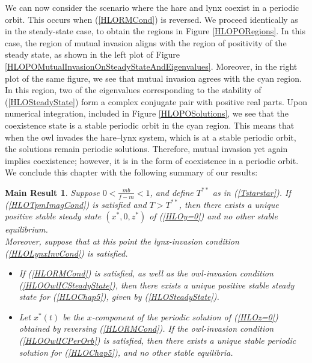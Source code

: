 \documentclass[12pt]{UOthesis}
\theoremstyle{remarkstyle}
\newtheorem{MainResult}[theo]{Main Result}
\begin{document}
We can now consider the scenario where the hare and lynx coexist in a periodic orbit. This occurs when (\ref{HLORMCond}) is reversed. We proceed identically as in the steady-state case, to obtain the regions in Figure \ref{HLOPORegions}. In this case, the region of mutual invasion aligns with the region of positivity of the steady state, as shown in the left plot of Figure \ref{HLOPOMutualInvasionOnSteadyStateAndEigenvalues}. Moreover, in the right plot of the same figure, we see that mutual invasion agrees with the cyan region. In this region, two of the eigenvalues corresponding to the stability of (\ref{HLOSteadyState}) form a complex conjugate pair with positive real parts. Upon numerical integration, included in Figure \ref{HLOPOSolutions}, we see that the coexistence state is a stable periodic orbit in the cyan region. This means that when the owl invades the hare--lynx system, which is at a stable periodic orbit, the solutions remain periodic solutions. Therefore, mutual invasion yet again implies coexistence; however, it is in the form of coexistence in a periodic orbit. We conclude this chapter with the following summary of our results:
\begin{MainResult}
	Suppose $0<\frac{mb}{f-m}<1$, and define $T^{**}$ as in (\ref{Tstarstar}). If (\ref{HLOTpmImagCond}) is satisfied and $T>T^{**}$, then there exists a unique positive stable steady state $(x^*,0,z^*)$ of (\ref{HLOy=0}) and no other stable equilibrium.\\
	
	Moreover, suppose that at this point the lynx-invasion condition (\ref{HLOLynxInvCond}) is satisfied.
	\begin{itemize}
		\item[(i)] If (\ref{HLORMCond}) is satisfied, as well as the owl-invasion condition (\ref{HLOOwlICSteadyState}), then there exists a unique positive stable steady state for (\ref{HLOChap5}), given by (\ref{HLOSteadyState}).
		\item[(ii)] Let $x^*(t)$ be the $x$-component of the periodic solution of (\ref{HLOz=0}) obtained by reversing (\ref{HLORMCond}). If the owl-invasion condition (\ref{HLOOwlICPerOrb}) is satisfied, then there exists a unique stable periodic solution for (\ref{HLOChap5}), and no other stable equilibria.
	\end{itemize}
	\label{TheoHLOMutInvCoex}
\end{MainResult} 
\end{document}
